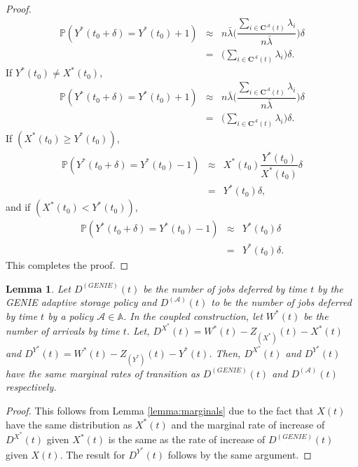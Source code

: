 \documentclass[10pt, conference, letterpaper]{IEEEtran}
\newtheorem{lemma}{Lemma}
\begin{document}
\begin{proof}
	\begin{eqnarray*}
		\mathbb{P}(Y^*(t_0+\delta) = Y^*(t_0 )+1) &\approx& n \bar{\lambda} \bigg(\dfrac{\sum_{i \in \mathbf{C^{\mathcal{A}}}(t)} \lambda_i}{n \bar{\lambda}}\bigg) \delta \\
		& = & \bigg(\sum_{i \in \mathbf{C^{\mathcal{A}}}(t)} \lambda_i\bigg) \delta.
	\end{eqnarray*}
	If $Y^*(t_0 ) \neq X^*(t_0 )$,
	\begin{eqnarray*}
		\mathbb{P}(Y^*(t_0+\delta) = Y^*(t_0 )+1) &\approx& n \bar{\lambda} \bigg(\dfrac{\sum_{i \in \mathbf{C^{\mathcal{A}}}(t)} \lambda_i}{n \bar{\lambda}}\bigg) \delta \\
		& = & \bigg(\sum_{i \in \mathbf{C^{\mathcal{A}}}(t)} \lambda_i\bigg) \delta.
	\end{eqnarray*}
	If $(X^*(t_0) \geq Y^*(t_0))$,
	\begin{eqnarray*}
		\mathbb{P}(Y^*(t_0+\delta) = Y^*(t_0 )-1) &\approx& X^*(t_0) \dfrac{Y^*(t_0)}{X^*(t_0)} \delta\\
		&=& Y^*(t_0) \delta,
	\end{eqnarray*}
	and if $(X^*(t_0) < Y^*(t_0))$,
	\begin{eqnarray*}
		\mathbb{P}(Y^*(t_0+\delta) = Y^*(t_0 )-1) &\approx& Y^*(t_0) \delta \\
		&=& Y^*(t_0) \delta.
	\end{eqnarray*}
	This completes the proof.
\end{proof}


\begin{lemma}
	\label{lemma:marginals_2}
	Let $D^{(GENIE)}(t)$ be the number of jobs deferred by time $t$ by the GENIE adaptive storage policy and $D^{(\mathcal{A})}(t)$ to be the number of jobs deferred by time $t$ by a policy $\mathcal{A} \in \mathds{A}$. In the coupled construction, let $W^*(t)$ be the number of arrivals by time $t$. Let, $D^{X^*}(t) = W^*(t) - Z_{(X^*)}(t) - X^*(t)$ and $D^{Y^*}(t)=W^*(t) - Z_{(Y^*)}(t) - Y^*(t)$. Then, $D^{X^*}(t)$ and $D^{Y^*}(t)$ have the same marginal rates of transition as $D^{(GENIE)}(t)$ and $D^{(\mathcal{A})}(t)$ respectively.
\end{lemma}
\begin{proof}
	This follows from Lemma \ref{lemma:marginals} due to the fact that $X(t)$ have the same distribution as $X^*(t)$ and the marginal rate of increase of $D^{X^*}(t)$ given $X^*(t)$ is the same as the rate of increase of $D^{(GENIE)}(t)$ given $X(t)$. The result for $D^{Y^*}(t)$ follows by the same argument.
\end{proof}
\end{document}
